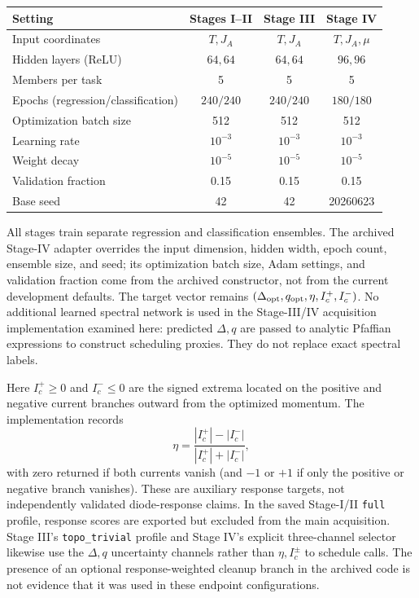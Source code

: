 \begin{AnchoredTable}\centering\setlength{\tabcolsep}{5pt}
\caption{Stage-specific training settings extracted from saved run configurations and the corresponding archived model constructors. Optimization batches are distinct from 256-point oracle batches.}\label{tab:networks}
\begin{tabular}{lccc}\toprule Setting & Stages I--II & Stage III & Stage IV\\\midrule
Input coordinates & $T,J_A$ & $T,J_A$ & $T,J_A,\mu$\\
Hidden layers (ReLU) & $64,64$ & $64,64$ & $96,96$\\
Members per task & 5 & 5 & 5\\
Epochs (regression/classification) & $240/240$ & $240/240$ & $180/180$\\
Optimization batch size & 512 & 512 & 512\\
Learning rate & $10^{-3}$ & $10^{-3}$ & $10^{-3}$\\
Weight decay & $10^{-5}$ & $10^{-5}$ & $10^{-5}$\\
Validation fraction & 0.15 & 0.15 & 0.15\\
Base seed & 42 & 42 & 20260623\\\bottomrule
\end{tabular}\end{AnchoredTable}
All stages train separate regression and classification ensembles. The archived Stage-IV adapter overrides the input dimension, hidden width, epoch count, ensemble size, and seed; its optimization batch size, Adam settings, and validation fraction come from the archived constructor, not from the current development defaults. The target vector remains $(\Delta_{\rm opt},q_{\rm opt},\eta,I_c^+,I_c^-)$. No additional learned spectral network is used in the Stage-III/IV acquisition implementation examined here: predicted $\Delta,q$ are passed to analytic Pfaffian expressions to construct scheduling proxies. They do not replace exact spectral labels.

Here $I_c^+\geq0$ and $I_c^-\leq0$ are the signed extrema located on the positive and negative current branches outward from the optimized momentum. The implementation records
\begin{equation}\eta=\frac{|I_c^+|-|I_c^-|}{|I_c^+|+|I_c^-|},\label{eq:eta}\end{equation}
with zero returned if both currents vanish (and $-1$ or $+1$ if only the positive or negative branch vanishes). These are auxiliary response targets, not independently validated diode-response claims. In the saved Stage-I/II \texttt{full} profile, response scores are exported but excluded from the main acquisition. Stage III's \texttt{topo\_trivial} profile and Stage IV's explicit three-channel selector likewise use the $\Delta,q$ uncertainty channels rather than $\eta,I_c^\pm$ to schedule calls. The presence of an optional response-weighted cleanup branch in the archived code is not evidence that it was used in these endpoint configurations.

